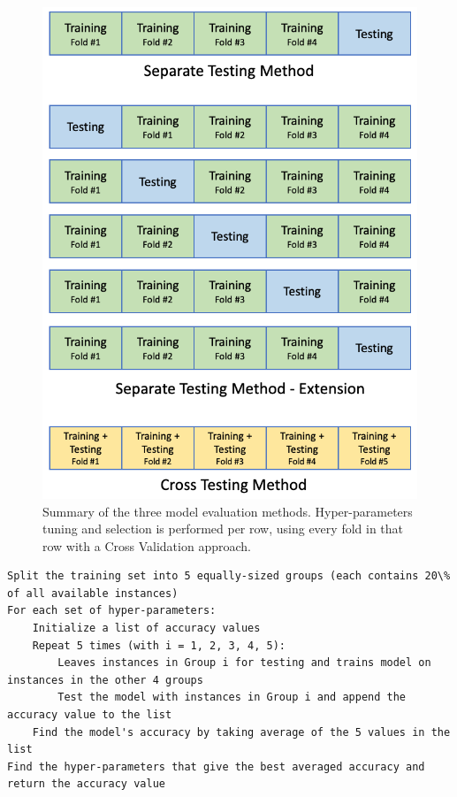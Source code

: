 \documentclass[letterpaper,twocolumn,10pt]{article}
\begin{document}
\begin{figure}[]
    \includegraphics[width=\linewidth]{Figures/testing_methods.png}
    \centering
    \caption{Summary of the three model evaluation methods. Hyper-parameters tuning and selection is performed per row, using every fold in that row with a Cross Validation approach.}
    \label{fig:testing_methods}
\end{figure}

\begin{lstlisting}[basicstyle=\scriptsize, float=*, label={lst:cross-testing}, caption={Pseudocode for the Cross Testing Procedure}]
Split the training set into 5 equally-sized groups (each contains 20\% of all available instances)
For each set of hyper-parameters:
    Initialize a list of accuracy values
    Repeat 5 times (with i = 1, 2, 3, 4, 5):
        Leaves instances in Group i for testing and trains model on instances in the other 4 groups
        Test the model with instances in Group i and append the accuracy value to the list
    Find the model's accuracy by taking average of the 5 values in the list
Find the hyper-parameters that give the best averaged accuracy and return the accuracy value
\end{lstlisting}
\end{document}
